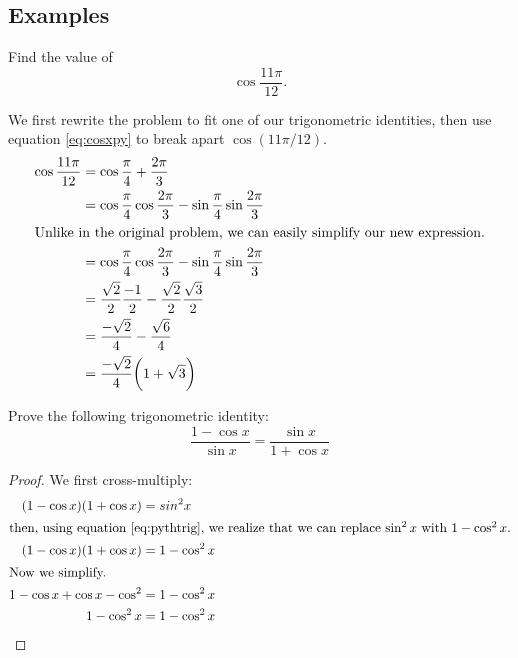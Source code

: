 \subsection{Examples}
\begin{ex}
  Find the value of
  \[ \cos{\frac{11 \pi}{12}} \text{.}\]
  \begin{sol}
    We first rewrite the problem to fit one of our trigonometric identities,
    then use equation \eqref{eq:cosxpy} to break apart $\cos{(11\pi /12)}$.
    \begin{align*}
      \cos{\frac{11 \pi}{12}}
      &=\cos{\frac{\pi}{4}+\frac{2 \pi}{3}}\\
      &=\cos{\frac{\pi}{4}} \cos{\frac{2\pi}{3}}
        -\sin\frac{\pi}{4} \sin\frac{2\pi}{3} \\
      \intertext{Unlike in the original problem, we can easily simplify our new expression.}
      &=\cos{\frac{\pi}{4}} \cos{\frac{2\pi}{3}}
        - \sin{\frac{\pi}{4}} \sin{\frac{2\pi}{3}}\\
      &= \frac{\sqrt 2}{2} \frac{-1}{2}
        -\frac{\sqrt 2}{2} \frac{\sqrt 3}{2}\\
      &=\frac{-\sqrt 2}{4}
        - \frac{\sqrt{6}}{4} \\
      &= \frac{-\sqrt 2}{4}\bigg(1+\sqrt 3\bigg)
    \end{align*}
  \end{sol}
\end{ex}
\begin{ex}
  Prove the following trigonometric identity:
  \[ \frac{1-\cos x}{\sin x}=\frac{\sin x}{1+\cos x} \]
  \begin{proof}
    We first cross-multiply:
    \begin{align*}
      \ (1-\cos x)(1+\cos x) &= sin^2 x \\
      \intertext{then, using equation \eqref{eq:pythtrig}, we realize that we can replace \(\sin^2 x\) with \(1-\cos^2 x\).}
       (1-\cos x)(1+\cos x) &= 1-\cos^2x\\
      \intertext{Now we simplify.}
      1-\cos x + \cos x -\cos^2 &= 1-\cos^2x \\
      1-\cos^2x &= 1-\cos^2x \qedhere
    \end{align*}
  \end{proof}
\end{ex}
